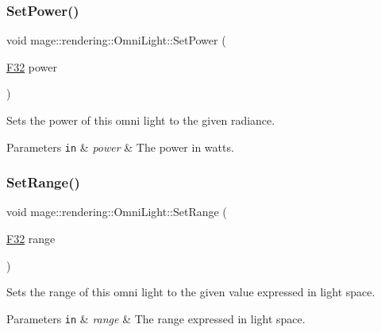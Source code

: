 \subsubsection{\texorpdfstring{Set\+Power()}{SetPower()}}
{\footnotesize\ttfamily void mage\+::rendering\+::\+Omni\+Light\+::\+Set\+Power (\begin{DoxyParamCaption}\item[{\mbox{\hyperlink{namespacemage_aa97e833b45f06d60a0a9c4fc22ae02c0}{F32}}}]{power }\end{DoxyParamCaption})\hspace{0.3cm}{\ttfamily [noexcept]}}

Sets the power of this omni light to the given radiance.


\begin{DoxyParams}[1]{Parameters}
\mbox{\tt in}  & {\em power} & The power in watts. \\
\hline
\end{DoxyParams}
\mbox{\label{classmage_1_1rendering_1_1_omni_light_a71d9cbef05c421a154b202e7a9b8eedb}} 
\subsubsection{\texorpdfstring{Set\+Range()}{SetRange()}}
{\footnotesize\ttfamily void mage\+::rendering\+::\+Omni\+Light\+::\+Set\+Range (\begin{DoxyParamCaption}\item[{\mbox{\hyperlink{namespacemage_aa97e833b45f06d60a0a9c4fc22ae02c0}{F32}}}]{range }\end{DoxyParamCaption})\hspace{0.3cm}{\ttfamily [noexcept]}}

Sets the range of this omni light to the given value expressed in light space.


\begin{DoxyParams}[1]{Parameters}
\mbox{\tt in}  & {\em range} & The range expressed in light space. \\
\hline
\end{DoxyParams}
\mbox{\label{classmage_1_1rendering_1_1_omni_light_a2817ab7a4c514785f01bf2e40c6245cb}} 
